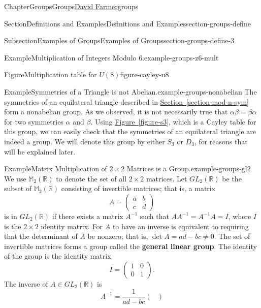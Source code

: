 \documentclass[oneside,10pt,]{book}
\newcommand{\xreffont}{\relax}
\newcommand{\terminology}[1]{\textbf{#1}}
\numberwithin{equation}{section}
\begin{document}
\begin{chapterptx}{Chapter}{Groups}{}{Groups}{\hyperlink{dfarmer}{David Farmer}}{}{groups}
\begin{sectionptx}{Section}{Definitions and Examples}{}{Definitions and Examples}{}{}{section-groups-define}
\begin{subsectionptx}{Subsection}{Examples of Groups}{}{Examples of Groups}{}{}{section-groups-define-3}
\begin{example}{Example}{Multiplication of Integers Modulo \(6\).}{example-groups-z6-mult}
\begin{figureptx}{Figure}{Multiplication table for \(U(8)\)}{figure-cayley-u8}{}
\begin{equation*}
\end{equation*}
%
\tcblower
\end{figureptx}%
\end{example}
\begin{example}{Example}{Symmetries of a Triangle is not Abelian.}{example-groups-nonabelian}%
The symmetries of an equilateral triangle described in \hyperref[section-mod-n-sym]{Section~{\xreffont\ref{section-mod-n-sym}}} form a nonabelian group. As we observed, it is not necessarily true that \(\alpha \beta = \beta \alpha\) for two symmetries \(\alpha\) and \(\beta\).  Using \hyperref[figure-s3]{Figure~{\xreffont\ref{figure-s3}}}, which is a Cayley table for this group, we can easily check that the symmetries of an equilateral triangle are indeed a group. We will denote this group by either \(S_3\) or \(D_3\), for reasons that will be explained later.%
\end{example}
\begin{example}{Example}{Matrix Multiplication of \(2\times 2\) Matrices is a Group.}{example-groups-gl2}%
We use  \({\mathbb M}_2 ( {\mathbb R})\) to denote the set of all \(2 \times 2\) matrices.  Let \(GL_2({\mathbb R})\) be the subset of \({\mathbb M}_2 ( {\mathbb R})\) consisting of invertible matrices; that is, a matrix \label{example-groups-gl2-2-5}%
\begin{equation*}
A =
\begin{pmatrix}
a & b \\
c & d
\end{pmatrix}
\end{equation*}
is in  \(GL_2( {\mathbb R})\) if there exists a matrix \(A^{-1}\) such that \(A A^{-1} = A^{-1} A = I\), where \(I\) is the \(2 \times 2\) identity matrix. For \(A\) to have an inverse is equivalent to requiring that the determinant of \(A\) be nonzero; that is, \(\det A = ad - bc \neq 0\). \label{example-groups-gl2-2-15} The set of invertible matrices forms a group called the \terminology{general linear group}.  \label{example-groups-gl2-2-18} The identity of the group is the identity matrix%
\begin{equation*}
I =
\begin{pmatrix}
1 & 0 \\
0 & 1
\end{pmatrix}\text{.}
\end{equation*}
The inverse of \(A \in GL_2( {\mathbb R})\) is%
\begin{equation*}
A^{-1} =
\frac{1}{ad-bc}
\begin{pmatrix}

\end{pmatrix}
\end{equation*}
\end{example}
\end{subsectionptx}
\end{sectionptx}
\end{chapterptx}
\end{document}
